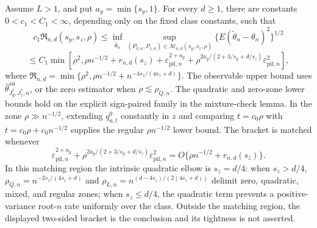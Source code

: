 Assume \(L>1\), and put \(a_y=\min\{s_y,1\}\). For every \(d\ge1\), there are constants \(0<c_1<C_1<\infty\), depending only on the fixed class constants, such that
\[
c_1\mathfrak R_{n,d}(s_y,s_z,\rho)\le\inf_{\widetilde\theta_n}\sup_{(P_{0,n},P_{1,n})\in\mathcal M_{n,d}(s_y,s_z,\rho)}\{E(\widetilde\theta_n-\theta_n)^2\}^{1/2}
\]
\[
\le C_1\min\!\left[\rho^2,\rho n^{-1/2}+r_{n,d}(s_z)+\varepsilon_{\mathrm{pil},n}^{2+a_y}+\rho^{2a_y/(2+3/s_y+d/s_z)}\varepsilon_{\mathrm{pil},n}^2\right],
\]
where \(\mathfrak R_{n,d}=\min\{\rho^2,\rho n^{-1/2}+n^{-4s_z/(4s_z+d)}\}\). The observable upper bound uses \(\widehat\theta^{\mathrm{an}}_{J_y^*,J_z^*,n}\), or the zero estimator when \(\rho\lesssim\rho_{Q,n}\). The quadratic and zero-zone lower bounds hold on the explicit sign-paired family in the mixture-check lemma. In the zone \(\rho\gg n^{-1/2}\), extending \(q_{a,t}^{0}\) constantly in \(z\) and comparing \(t=c_0\rho\) with \(t=c_0\rho+c_0n^{-1/2}\) supplies the regular \(\rho n^{-1/2}\) lower bound. The bracket is matched whenever
\[
\varepsilon_{\mathrm{pil},n}^{2+a_y}+\rho^{2a_y/(2+3/s_y+d/s_z)}\varepsilon_{\mathrm{pil},n}^2
=O\{\rho n^{-1/2}+r_{n,d}(s_z)\}.
\]
In this matching region the intrinsic quadratic elbow is \(s_z=d/4\): when \(s_z>d/4\), \(\rho_{Q,n}=n^{-2s_z/(4s_z+d)}\) and \(\rho_{L,n}=n^{(d-4s_z)/(2(4s_z+d))}\) delimit zero, quadratic, mixed, and regular zones; when \(s_z\le d/4\), the quadratic term prevents a positive-variance root-\(n\) rate uniformly over the class. Outside the matching region, the displayed two-sided bracket is the conclusion and its tightness is not asserted.